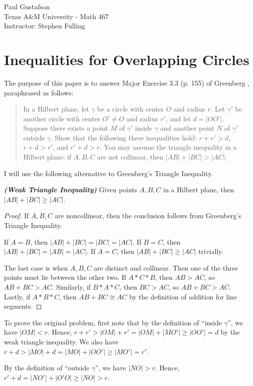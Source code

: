 \documentclass{article}
\begin{document}
\noindent Paul Gustafson\\
\noindent Texas A\&M University - Math 467\\ 
\noindent Instructor: Stephen Fulling

\section*{Inequalities for Overlapping Circles}

The purpose of this paper is to answer Major Exercise 3.3 (p. 155) of Greenberg \cite{g}, paraphrased as follows:
\begin{quote}
In a Hilbert plane, let $\gamma$ be a circle with center $O$ and radius $r$.  Let $\gamma'$ be another circle with center $O' \neq O$ and radius $r'$, and let $d = |OO'|$.   Suppose there exists a point $M$ of $\gamma'$ inside $\gamma$ and another point $N$ of $\gamma'$ outside $\gamma$. Show that the following three inequalities hold: $r + r' > d$, $r + d > r'$, and $r' + d > r$. You may assume the triangle inequality in a Hilbert plane: if $A,B,C$ are not collinear, then $|AB| + |BC| > |AC|$.
\end{quote}

I will use the following alternative to Greenberg's Triangle Inequality.
\begin{theorem}
\emph{\textbf{(Weak Triangle Inequality)}} Given points $A,B,C$ in a Hilbert plane, then $|AB| + |BC| \ge |AC|$.
\end{theorem}
\begin{proof}
If $A,B,C$ are noncollinear, then the conclusion follows from Greenberg's Triangle Inequality.

If $A = B$, then $|AB| + |BC| = |BC| = |AC|$.  If $B=C$, then $|AB| + |BC| = |AB| = |AC|$.  If $A=C$, then $|AB| + |BC| \ge |AC|$ trivially.

The last case is when $A,B,C$ are distinct and collinear.  Then one of the three points must lie between the other two. If $A*C*B$, then $AB > AC$, so $AB + BC > AC$.  Similarly, if $B*A*C$, then $BC > AC$, so $AB + BC > AC$.  Lastly, if $A*B*C$, then $AB + BC \cong AC$ by the definition of addition for line segments.
\end{proof}

To prove the original problem, first note that by the definition of ``inside $\gamma$'', we have $|OM| < r$.  Hence, $r + r' > |OM| + r' =  |OM| + |MO'| \ge |OO'| = d$ by the weak triangle inequality.  We also have $r + d > |MO| +  d = |MO| + |OO'| \ge |MO'| = r'$.

By the definition of ``outside $\gamma$'', we have $|NO| > r$.  Hence, $r' + d = |NO'| + |O'O| \ge |NO| > r$.




\end{document}
